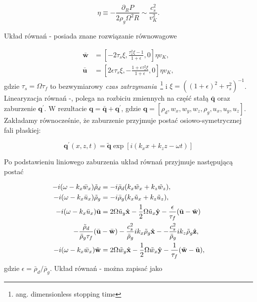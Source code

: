 \begin{equation}
\eta \equiv - \frac{\partial_R P}{2\rho_g\Omega^2 R} \sim \frac{c_s^2}{v_K^2}.
\end{equation}

Układ równań - posiada znane rozwiązanie równowagowe~\citep{N86}

\begin{align}
\bar{\mathbf{w}} &= \left[ 
 -2\tau_s\xi, \frac{\tau_s^2\xi - 1}{1+\epsilon},
 0
\right]\eta v_K, \label{eq:w0}\\
\bar{\mathbf{u}} &= \left[ 
 2\epsilon\tau_s\xi, -\frac{1 + \epsilon\tau_s^2\xi}{1+\epsilon},
 0
\right]\eta v_K, \label{eq:u0}
\end{align}
%
gdzie $\tau_s = \Omega \tau_f$ to bezwymiarowy \emph{czas
zatrzymania}~\footnote{ang. dimensionless stopping time} i $\xi =
((1+\epsilon)^2 + \tau_s^2)^{-1}$.  Linearyzacja równań -,
polega na rozbiciu zmiennych na część stałą $\bar{\mathbf{q}}$ oraz zaburzenie
$\mathbf{q}^\prime$. W rezultacie $\mathbf{q} =
\bar{\mathbf{q}} + \mathbf{q}^\prime$, gdzie $\mathbf{q}=[\rho_d, w_x, w_y, w_z,
\rho_g, u_x, u_y, u_z]$. Zakładamy równocześnie, że zaburzenie przyjmuje postać
osiowo-symetrycznej fali płaskiej:

\begin{equation}
   \label{eq:planar}
   \mathbf{q}^\prime(x,z,t) = \tilde{\mathbf{q}}
 \exp\left[i(k_x x + k_z z -\omega t)\right]
\end{equation}

Po podstawieniu liniowego zaburzenia układ równań przyjmuje następującą postać

\begin{align}
-i(\omega- k_x\bar{w}_x)\tilde{\rho}_d &= 
 - i \bar{\rho}_d(k_x\tilde{w}_x + k_z\tilde{w}_z), \label{lin1}\\
-i(\omega- k_x\bar{u}_x)\tilde{\rho}_g &= 
 - i \bar{\rho}_g(k_x\tilde{u}_x + k_z\tilde{u}_z), \label{lin2}\\
-i(\omega- k_x\bar{u}_x)\tilde{\mathbf{u}} &= 
 2\Omega \tilde{u}_y\hat{\mathbf{x}} - \frac{1}{2}\Omega \tilde{u}_x
 \hat{\mathbf{y}}
 -\frac{\epsilon}{\tau_f}(\tilde{\mathbf{u}} - \tilde{\mathbf{w}}) \notag\\
  -\frac{\tilde{\rho}_d}{\bar{\rho}_g\tau_f}
  (\bar{\mathbf{u}} &- \bar{\mathbf{w}})
  - \frac{c_s^2}{\bar{\rho}_g}ik_x\tilde{\rho}_g\hat{\mathbf{x}} -
  - \frac{c_s^2}{\bar{\rho}_g}ik_z\tilde{\rho}_g\hat{\mathbf{z}}, \label{lin3}\\
-i(\omega- k_x\bar{w}_x)\tilde{\mathbf{w}} &= 
 2\Omega \tilde{w}_y\hat{\mathbf{x}} - \frac{1}{2}\Omega \tilde{w}_x
 \hat{\mathbf{y}} 
 - \frac{1}{\tau_f} (\tilde{\mathbf{w}} - \tilde{\mathbf{u}}), \label{lin4}
\end{align}
%
gdzie $\epsilon = \bar{\rho}_d/\bar{\rho}_g$. Układ równań
- można zapisać jako

